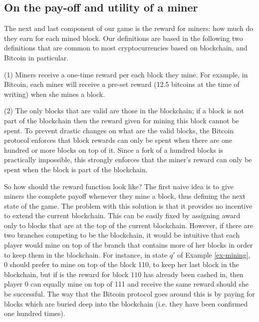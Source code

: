 
\subsection{On the pay-off and utility of a miner}\label{sec-wtf}

The next and last component of our game is the reward for miners: how much do they earn for each mined block. Our definitions are based in the following 
two definitions that are common to most cryptocurrencies based on blockchain, and Bitcoin in particular. 

\noindent
(1) Miners receive a one-time reward per each block they mine. For example, in Bitcoin, each miner will receive a pre-set reward (12.5 bitcoins at the time of writing) when she mines a block.

\noindent
(2) The only blocks that are valid are those in the blockchain; if a block is not part of the blockchain then the reward given for mining this block cannot be spent. To prevent drastic changes on what are the valid blocks, the Bitcoin protocol enforces that block rewards can only be spent when there are one hundred or more blocks on top of it. Since a fork of a hundred blocks is practically impossible, this strongly enforces that the miner's reward can only be spent when the block is part of the blockchain.  

So how should the reward function look like? The first naive idea is to give miners the complete payoff whenever they mine a block, thus defining the next state of the game. The problem with this solution is that it provides no incentive to extend the current blockchain. This can be easily fixed by assigning award only to blocks that are at the top of the current blockchain. However, if there are two branches competing to be the blockchain, it would be intuitive that each player would mine on top of the branch that contains more of her blocks in order to keep them in the blockchain. For instance, in state $q'$ of Example \ref{ex-mining}, 0 should prefer to mine on top of the block 110, to keep her last block in the blockchain, but if is the reward for block $110$ has already been cashed in, then player $0$ can equally mine on top of 111 and receive the same reward should she be successful. The way that the Bitcoin protocol goes around this is by paying for blocks which are buried deep into the blockchain (i.e. they have been confirmed one hundred times).

